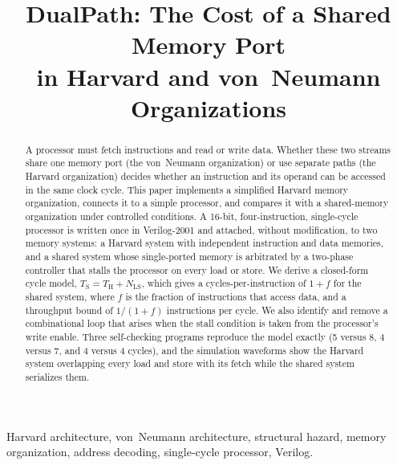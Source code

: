 \documentclass[conference]{IEEEtran}
\newcommand{\NLS}{N_{\mathrm{LS}}}
\newcommand{\Tharv}{T_{\mathrm{H}}}
\newcommand{\Tshr}{T_{\mathrm{S}}}
\begin{document}
\title{DualPath: The Cost of a Shared Memory Port\\in Harvard and von~Neumann Organizations}

\author{
}

\maketitle

\begin{abstract}
A processor must fetch instructions and read or write data. Whether these two streams share one
memory port (the von~Neumann organization) or use separate paths (the Harvard organization)
decides whether an instruction and its operand can be accessed in the same clock cycle. This paper
implements a simplified Harvard memory organization, connects it to a simple processor, and
compares it with a shared-memory organization under controlled conditions. A 16-bit,
four-instruction, single-cycle processor is written once in Verilog-2001 and attached, without
modification, to two memory systems: a Harvard system with independent instruction and data
memories, and a shared system whose single-ported memory is arbitrated by a two-phase controller
that stalls the processor on every load or store. We derive a closed-form cycle model,
$\Tshr = \Tharv + \NLS$, which gives a cycles-per-instruction of $1+f$ for the shared system, where $f$
is the fraction of instructions that access data, and a throughput bound of $1/(1+f)$
instructions per cycle. We also identify and remove a combinational loop that arises when the
stall condition is taken from the processor's write enable. Three self-checking programs
reproduce the model exactly (5 versus 8, 4 versus 7, and 4 versus 4 cycles), and the simulation
waveforms show the Harvard system overlapping every load and store with its fetch while the
shared system serializes them.
\end{abstract}

\begin{IEEEkeywords}
Harvard architecture, von~Neumann architecture, structural hazard, memory organization,
address decoding, single-cycle processor, Verilog.
\end{IEEEkeywords}
\end{document}
